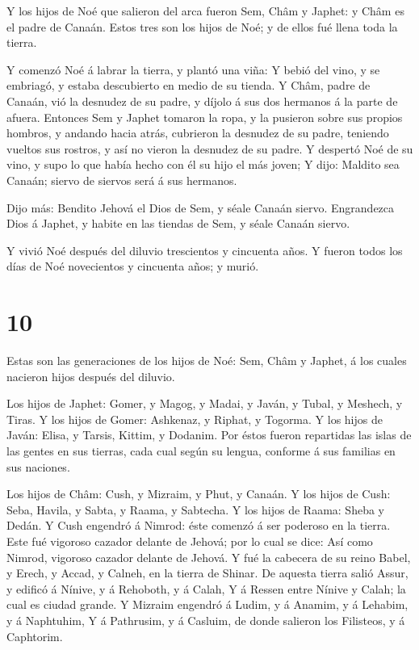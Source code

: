  Y los hijos de Noé que salieron del arca fueron Sem, Châm
y Japhet: y Châm es el padre de Canaán.  Estos tres son los
hijos de Noé; y de ellos fué llena toda la tierra.

 Y comenzó Noé á labrar la tierra, y plantó una viña:
 Y bebió del vino, y se embriagó, y estaba descubierto en
medio de su tienda.  Y Châm, padre de Canaán, vió la
desnudez de su padre, y díjolo á sus dos hermanos á la parte de afuera.
 Entonces Sem y Japhet tomaron la ropa, y la pusieron sobre
sus propios hombros, y andando hacia atrás, cubrieron la desnudez de su
padre, teniendo vueltos sus rostros, y así no vieron la desnudez de su
padre.  Y despertó Noé de su vino, y supo lo que había
hecho con él su hijo el más joven;  Y dijo: Maldito sea
Canaán; siervo de siervos será á sus hermanos.

 Dijo más: Bendito Jehová el Dios de Sem, y séale Canaán
siervo.  Engrandezca Dios á Japhet, y habite en las tiendas
de Sem, y séale Canaán siervo.

 Y vivió Noé después del diluvio trescientos y cincuenta
años.  Y fueron todos los días de Noé novecientos y
cincuenta años; y murió.

\hypertarget{section-9}{%
\section{10}\label{section-9}}

 Estas son las generaciones de los hijos de Noé: Sem, Châm y
Japhet, á los cuales nacieron hijos después del diluvio.

 Los hijos de Japhet: Gomer, y Magog, y Madai, y Javán, y
Tubal, y Meshech, y Tiras.  Y los hijos de Gomer: Ashkenaz,
y Riphat, y Togorma.  Y los hijos de Javán: Elisa, y Tarsis,
Kittim, y Dodanim.  Por éstos fueron repartidas las islas de
las gentes en sus tierras, cada cual según su lengua, conforme á sus
familias en sus naciones.

 Los hijos de Châm: Cush, y Mizraim, y Phut, y Canaán.
 Y los hijos de Cush: Seba, Havila, y Sabta, y Raama, y
Sabtecha. Y los hijos de Raama: Sheba y Dedán.  Y Cush
engendró á Nimrod: éste comenzó á ser poderoso en la tierra.
 Este fué vigoroso cazador delante de Jehová; por lo cual se
dice: Así como Nimrod, vigoroso cazador delante de Jehová. 
Y fué la cabecera de su reino Babel, y Erech, y Accad, y Calneh, en la
tierra de Shinar.  De aquesta tierra salió Assur, y edificó
á Nínive, y á Rehoboth, y á Calah,  Y á Ressen entre Nínive
y Calah; la cual es ciudad grande.  Y Mizraim engendró á
Ludim, y á Anamim, y á Lehabim, y á Naphtuhim,  Y á
Pathrusim, y á Casluim, de donde salieron los Filisteos, y á Caphtorim.

